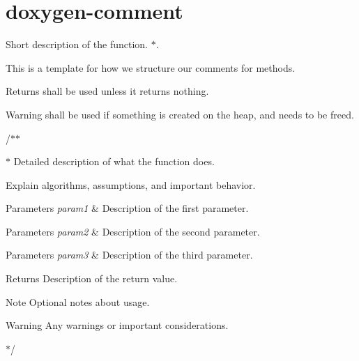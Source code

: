 \chapter{doxygen-\/comment }
\hypertarget{md_docs_2doxygen-comment}{}\label{md_docs_2doxygen-comment}
Short description of the function. \texorpdfstring{$\ast$}{*}.

This is a template for how we structure our comments for methods.

\begin{DoxyReturn}{Returns}
shall be used unless it returns nothing. 
\end{DoxyReturn}
\begin{DoxyWarning}{Warning}
shall be used if something is created on the heap, and needs to be freed.
\end{DoxyWarning}
/\+\texorpdfstring{$\ast$}{*}\texorpdfstring{$\ast$}{*}
\begin{DoxyItemize}
\item \texorpdfstring{$\ast$}{*} Detailed description of what the function does.
\item Explain algorithms, assumptions, and important behavior.
\item 
\item 
\begin{DoxyParams}{Parameters}
{\em param1} & Description of the first parameter.\\
\hline
\end{DoxyParams}

\item 
\begin{DoxyParams}{Parameters}
{\em param2} & Description of the second parameter.\\
\hline
\end{DoxyParams}

\item 
\begin{DoxyParams}{Parameters}
{\em param3} & Description of the third parameter.\\
\hline
\end{DoxyParams}

\item 
\item \begin{DoxyReturn}{Returns}
Description of the return value.
\end{DoxyReturn}

\item 
\item \begin{DoxyNote}{Note}
Optional notes about usage.
\end{DoxyNote}

\item \begin{DoxyWarning}{Warning}
Any warnings or important considerations.
\end{DoxyWarning}

\item \texorpdfstring{$\ast$}{*}/\+ 
\end{DoxyItemize}